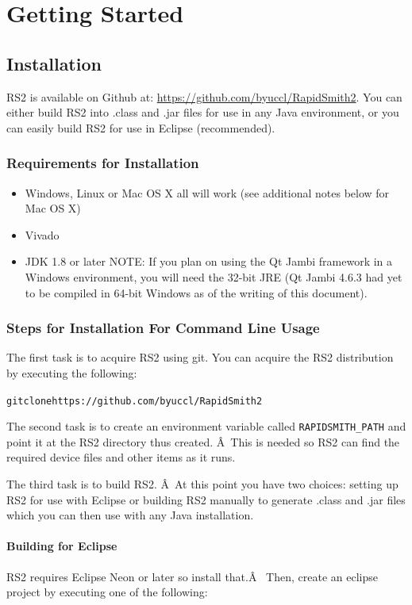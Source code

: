 \documentclass[12pt]{article}
\newcommand{\env}[1]{{\texttt{#1}}}
\newenvironment{code}{\begin{center} \begin{minipage}{6in} \noindent \begin{alltt}}{\end{alltt} \end{minipage} \end{center}}
\begin{document}
\section{Getting Started}

\subsection{Installation}

RS2 is available on Github at: \url{https://github.com/byuccl/RapidSmith2}.  
You can either build RS2 into .class and .jar files for use in any Java
environment, or you can easily build RS2 for use in Eclipse (recommended).

\subsubsection{Requirements for Installation}
\begin{itemize}
  \item Windows, Linux or Mac OS X all will work (see additional notes below for
  Mac OS X)
  \item Vivado
  \item JDK 1.8 or later NOTE: If you plan on using the Qt Jambi framework in a
  Windows environment, you will need the 32-bit JRE (Qt Jambi 4.6.3 had yet to
  be compiled in 64-bit Windows as of the writing of this document).
\end{itemize}
 
\subsubsection{Steps for Installation For Command Line Usage}
The first task is to acquire RS2 using git.
You can acquire the RS2 distribution by executing the following: 
\vspace{-0.15in}  \begin{code}
git clone https://github.com/byuccl/RapidSmith2
\end{code} 
The second task is to create an environment variable called
\env{RAPIDSMITH\_PATH} and point it at the RS2 directory thus created. Â This is
needed so RS2 can find the required device files and other items as it runs.

The third task is to build RS2. Â At this point you have two choices: setting up
RS2 for use with Eclipse or building RS2 manually to generate
.class and .jar files which you can then use with any Java installation.
	
\paragraph{Building for Eclipse}  
RS2 requires Eclipse Neon or later so install that.Â 
Then, create an eclipse project by executing one of the following:
\end{document}
